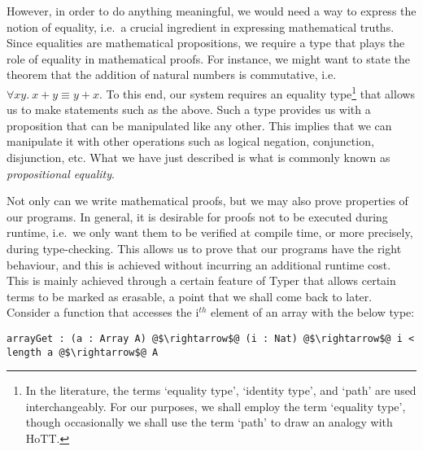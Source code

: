 \documentclass[12pt,twoside,maitrise]{dms}
\theoremstyle{definition}
\numberwithin{equation}{section}
\numberwithin{table}{chapter}
\numberwithin{figure}{chapter}
\begin{document}
However, in order to do anything meaningful, we would need a way to express the
notion of equality, i.e.\ a crucial ingredient in expressing mathematical
truths. Since equalities are mathematical propositions, we require a type that
plays the role of equality in mathematical proofs. For instance, we might want
to state the theorem that the addition of natural numbers is commutative, i.e.
$\forall xy. \ x + y \equiv y + x$. To this end, our system requires an equality
type\footnote{In the literature, the terms `equality type', `identity type', and
`path' are used interchangeably. For our purposes, we shall employ the term
`equality type', though occasionally we shall use the term `path' to draw an
analogy with HoTT.} that allows us to make statements such as the above. Such a
type provides us with a proposition that can be manipulated like any other. This
implies that we can manipulate it with other operations such as logical
negation, conjunction, disjunction, etc. What we have just described is what is
commonly known as \emph{propositional equality}.


Not only can we write mathematical proofs, but we may also prove properties of
our programs. In general, it is desirable for proofs not to be executed during
runtime, i.e.\ we only want them to be verified at compile time, or more
precisely, during type-checking. This allows us to prove that our programs have
the right behaviour, and this is achieved without incurring an additional runtime
cost. This is mainly achieved through a certain feature of Typer that allows
certain terms to be marked as erasable, a point that we shall come back to
later. Consider a function that accesses the i$^{th}$ element of an array with the
below type:

\begin{verbatim}
arrayGet : (a : Array A) @$\rightarrow$@ (i : Nat) @$\rightarrow$@ i < length a @$\rightarrow$@ A
\end{verbatim}
\end{document}
